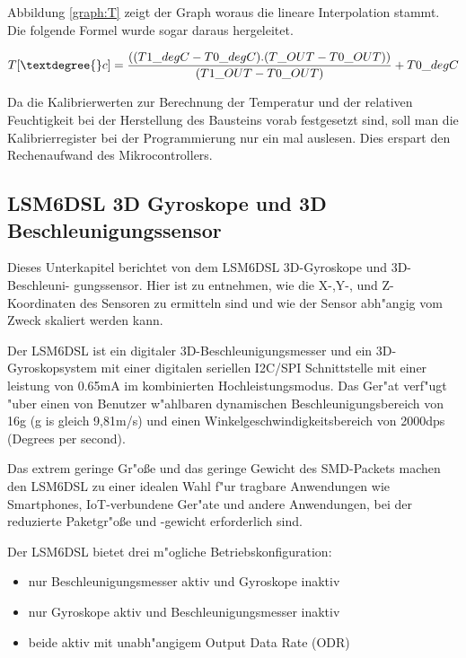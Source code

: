 Abbildung \ref{graph:T} zeigt der Graph woraus die lineare Interpolation stammt. Die folgende Formel wurde sogar daraus hergeleitet.

\begin{center}
	\[
	T[\textdegree{}c] = \frac{((T1\_degC - T0\_degC) . (T\_OUT - T0\_OUT))}{(T1\_OUT - T0\_OUT) } + T0\_degC  
	\]\label{TempFormel}
\end{center}

 Da die Kalibrierwerten zur Berechnung der Temperatur und der relativen Feuchtigkeit bei der Herstellung des Bausteins vorab festgesetzt sind, soll man die Kalibrierregister bei der Programmierung nur ein mal auslesen. Dies erspart den Rechenaufwand des Mikrocontrollers.
 
\subsection{LSM6DSL 3D Gyroskope und 3D Beschleunigungssensor}\label{Acc/Gy}

Dieses Unterkapitel berichtet von dem LSM6DSL 3D-Gyroskope und 3D-Beschleuni- gungssensor. Hier ist zu entnehmen, wie die X-,Y-, und Z-Koordinaten des Sensoren zu ermitteln sind und wie der Sensor abh"angig vom Zweck skaliert werden kann.
 

Der LSM6DSL ist ein digitaler 3D-Beschleunigungsmesser und ein 3D-Gyroskopsystem mit einer digitalen seriellen I2C/SPI Schnittstelle mit einer leistung von 0.65mA im kombinierten Hochleistungsmodus.
Das Ger"at verf"ugt "uber einen von Benutzer w"ahlbaren dynamischen Beschleunigungsbereich von  \textbar {} \textbar {} \textbar \textpm 16g (g is gleich 9,81m/s) und einen Winkelgeschwindigkeitsbereich von  \textbar {} \textbar {} \textbar {} \textbar \textpm 2000dps (Degrees per second).
 
Das extrem geringe Gr"o\ss{}e und das geringe Gewicht des SMD-Packets machen den LSM6DSL zu einer idealen Wahl f"ur tragbare Anwendungen wie Smartphones, IoT-verbundene Ger"ate und andere Anwendungen, bei der reduzierte Paketgr"o\ss{}e und -gewicht erforderlich sind.  

Der LSM6DSL bietet drei m"ogliche Betriebskonfiguration:
\begin{itemize}
	\item nur Beschleunigungsmesser aktiv und Gyroskope inaktiv
	\item nur Gyroskope aktiv und Beschleunigungsmesser inaktiv
	\item beide aktiv mit unabh"angigem Output Data Rate (ODR) 
\end{itemize}

